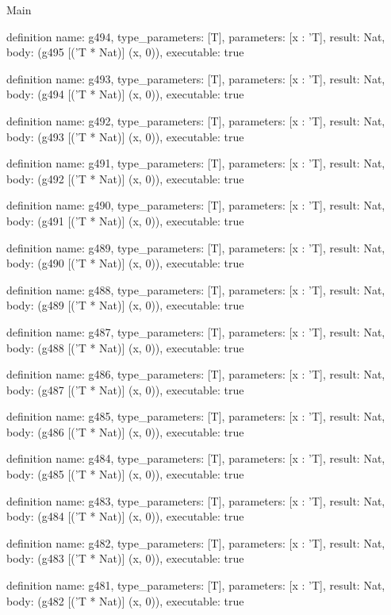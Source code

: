 \begin{lexlean}{Main}
\begin{semanticmodule}
definition{
  name: g494,
  type_parameters: [T],
  parameters: [x : 'T],
  result: Nat,
  body: (g495 [('T * Nat)] (x, 0)),
  executable: true
}

definition{
  name: g493,
  type_parameters: [T],
  parameters: [x : 'T],
  result: Nat,
  body: (g494 [('T * Nat)] (x, 0)),
  executable: true
}

definition{
  name: g492,
  type_parameters: [T],
  parameters: [x : 'T],
  result: Nat,
  body: (g493 [('T * Nat)] (x, 0)),
  executable: true
}

definition{
  name: g491,
  type_parameters: [T],
  parameters: [x : 'T],
  result: Nat,
  body: (g492 [('T * Nat)] (x, 0)),
  executable: true
}

definition{
  name: g490,
  type_parameters: [T],
  parameters: [x : 'T],
  result: Nat,
  body: (g491 [('T * Nat)] (x, 0)),
  executable: true
}

definition{
  name: g489,
  type_parameters: [T],
  parameters: [x : 'T],
  result: Nat,
  body: (g490 [('T * Nat)] (x, 0)),
  executable: true
}

definition{
  name: g488,
  type_parameters: [T],
  parameters: [x : 'T],
  result: Nat,
  body: (g489 [('T * Nat)] (x, 0)),
  executable: true
}

definition{
  name: g487,
  type_parameters: [T],
  parameters: [x : 'T],
  result: Nat,
  body: (g488 [('T * Nat)] (x, 0)),
  executable: true
}

definition{
  name: g486,
  type_parameters: [T],
  parameters: [x : 'T],
  result: Nat,
  body: (g487 [('T * Nat)] (x, 0)),
  executable: true
}

definition{
  name: g485,
  type_parameters: [T],
  parameters: [x : 'T],
  result: Nat,
  body: (g486 [('T * Nat)] (x, 0)),
  executable: true
}

definition{
  name: g484,
  type_parameters: [T],
  parameters: [x : 'T],
  result: Nat,
  body: (g485 [('T * Nat)] (x, 0)),
  executable: true
}

definition{
  name: g483,
  type_parameters: [T],
  parameters: [x : 'T],
  result: Nat,
  body: (g484 [('T * Nat)] (x, 0)),
  executable: true
}

definition{
  name: g482,
  type_parameters: [T],
  parameters: [x : 'T],
  result: Nat,
  body: (g483 [('T * Nat)] (x, 0)),
  executable: true
}

definition{
  name: g481,
  type_parameters: [T],
  parameters: [x : 'T],
  result: Nat,
  body: (g482 [('T * Nat)] (x, 0)),
  executable: true
}


\end{semanticmodule}
\end{lexlean}
